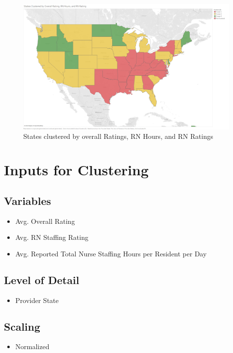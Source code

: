 \documentclass{article}
\theoremstyle{mytheoremstyle}
\theoremstyle{mytheoremstyle}
\theoremstyle{myproblemstyle}
\begin{document}
\begin{figure}[htbp]
\centering
\includegraphics[width=\linewidth]{Images/States Clustered by Overall Rating, RN Hours, and RN Rating.png}
\caption{States clustered by overall Ratings, RN Hours, and RN Ratings}
\label{fig:Clustering by Prov Data}
\end{figure}

\section*{Inputs for Clustering}
\subsection*{Variables}
\begin{itemize}
    \item Avg. Overall Rating
    \item Avg. RN Staffing Rating
    \item Avg. Reported Total Nurse Staffing Hours per Resident per Day
\end{itemize}
\subsection*{Level of Detail}
\begin{itemize}
    \item Provider State
\end{itemize}
\subsection*{Scaling}
\begin{itemize}
    \item Normalized
\end{itemize}
\end{document}
